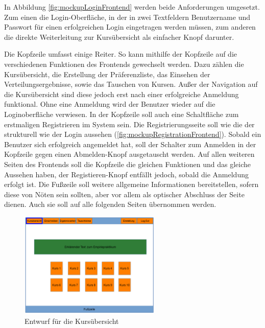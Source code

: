             In Abbildung \ref{fig:mockupLoginFrontend} werden beide Anforderungen umgesetzt.
            Zum einen die Login-Oberfläche, in der in zwei Textfeldern Benutzername und Passwort für einen erfolgreichen Login eingetragen werden müssen, zum anderen die direkte Weiterleitung zur Kursübersicht als einfacher Knopf darunter.

            Die Kopfzeile umfasst einige Reiter.
            So kann mithilfe der Kopfzeile auf die verschiedenen Funktionen des Frontends gewechselt werden. 
            Dazu zählen die Kursübersicht, die Erstellung der Präferenzliste, das Einsehen der Verteilungsergebnisse, sowie das Tauschen von Kursen.
            Außer der Navigation auf die Kursübersicht sind diese jedoch erst nach einer erfolgreiche Anmeldung funktional.
            Ohne eine Anmeldung wird der Benutzer wieder auf die Loginoberfläche verwiesen.
            In der Kopfzeile soll auch eine Schaltfläche zum erstmaligen Registrieren im System sein.
            Die Registrierungsseite soll wie die der strukturell wie der Login aussehen (\ref{fig:mockupRegistrationFrontend}).
            Sobald ein Benutzer sich erfolgreich angemeldet hat, soll der Schalter zum Anmelden in der Kopfzeile gegen einen Abmelden-Knopf ausgetauscht werden.
			Auf allen weiteren Seiten des Frontends soll die Kopfzeile die gleichen Funktionen und das gleiche Aussehen haben, der Registieren-Knopf entfällt jedoch, sobald die Anmeldung erfolgt ist.
            Die Fußzeile soll weitere allgemeine Informationen bereitstellen, sofern diese von Nöten sein sollten, aber vor allem als optischer Abschluss der Seite dienen.
            Auch sie soll auf alle folgenden Seiten übernommen werden.
			
			\begin{figure}[t]
				\centering
				\includegraphics[width=0.6\textwidth]{./design/images/MockUpsFrontend/frontendCourses.png}
				\caption{Entwurf für die Kursübersicht}
				\label{fig:mockupCoursesFrontend}
			\end{figure}
			
